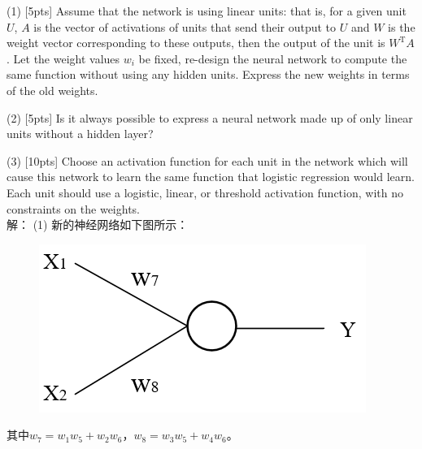 \documentclass{article}
\begin{document}
	(1) [5pts] Assume that the network is using linear units: that is, for a given unit $U$, $A$ is the vector of activations of units that send their output to $U$ and $W$ is the weight vector corresponding to these outputs, then the output of the unit is $W^{\mathrm{T}}A$. Let the weight values $w_i$ be fixed, re-design the neural network to compute the same function without using any hidden units. Express the new weights in terms of the old weights.
	
	(2) [5pts] Is it always possible to express a neural network made up of only linear units without a hidden layer?
	
	(3) [10pts] Choose an activation function for each unit in the network which will cause this network to learn the same function that logistic regression would learn. Each unit should use a logistic, linear, or threshold activation function, with no constraints on the weights.
	\\
	
	\noindent 解：
	(1) 新的神经网络如下图所示：
	\begin{figure}[H]
		\centering
		\includegraphics[scale=0.7]{p2-nn2.png}
	\end{figure}
	\noindent 其中$w_7=w_1w_5+w_2w_6$，$w_8=w_3w_5+w_4w_6$。
\end{document}
